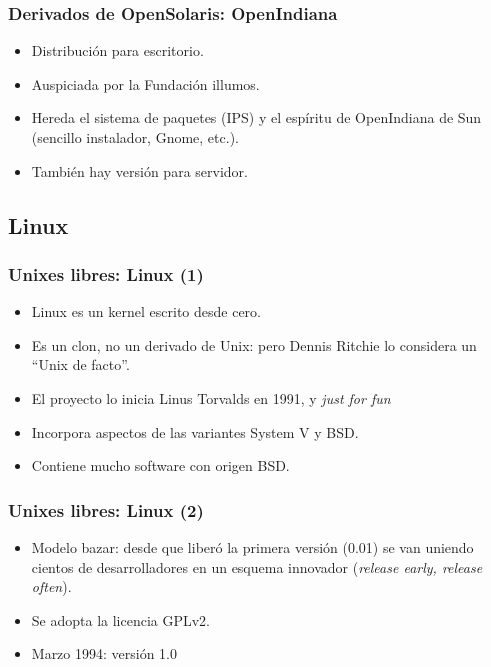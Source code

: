 \documentclass{beamer}
\begin{document}

\begin{frame}
\frametitle{Derivados de OpenSolaris: OpenIndiana}

\begin{itemize}
\item Distribución para escritorio.
\item Auspiciada por la Fundación illumos.
\item Hereda el sistema de paquetes (IPS) y el espíritu de OpenIndiana de Sun (sencillo instalador, Gnome, etc.).
\item También hay versión para servidor.
\end{itemize}

\end{frame}


\subsection{Linux}

\begin{frame}
\frametitle{Unixes libres: Linux (1)}

\begin{itemize}
\item Linux es un kernel escrito desde cero. 
\item Es un clon, no un derivado de Unix: pero Dennis Ritchie lo considera un ``Unix de facto''.
\item El proyecto lo inicia Linus Torvalds en 1991, y \textit{just for fun}
\item Incorpora aspectos de las variantes System V y BSD. 
\item Contiene mucho software con origen BSD.
\end{itemize}

\end{frame}

\begin{frame}
\frametitle{Unixes libres: Linux (2)}

\begin{itemize}
\item Modelo bazar: desde que liberó la primera versión (0.01) se van uniendo cientos de desarrolladores en un esquema innovador (\textit{release early, release often}).
\item Se adopta la licencia GPLv2.
\item Marzo 1994: versión 1.0
\end{itemize}

\end{frame}
\end{document}
